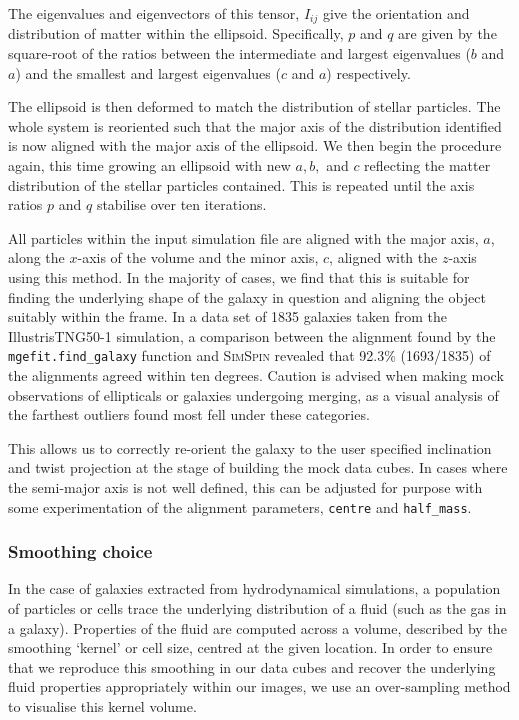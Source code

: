 \documentclass[
  journal=pasa,
  manuscript=research-paper, %
  year=2020,
  volume=37,
]{cup-journal}
\newcommand{\simspin}[1]{\textsc{SimSpin}#1} %
\begin{document}
The eigenvalues and eigenvectors of this tensor, $I_{ij}$ give the orientation and distribution of matter within the ellipsoid. 
Specifically, $p$ and $q$ are given by the square-root of the ratios between the intermediate and largest eigenvalues ($b$ and $a$) and the smallest and largest eigenvalues ($c$ and $a$) respectively. 

The ellipsoid is then deformed to match the distribution of stellar particles.
The whole system is reoriented such that the major axis of the distribution identified is now aligned with the major axis of the ellipsoid. 
We then begin the procedure again, this time growing an ellipsoid with new $a, b,$ and $c$ reflecting the matter distribution of the stellar particles contained. 
This is repeated until the axis ratios $p$ and $q$ stabilise over ten iterations. 

All particles within the input simulation file are aligned with the major axis, $a$, along the $x$-axis of the volume and the minor axis, $c$, aligned with the $z$-axis using this method. 
In the majority of cases, we find that this is suitable for finding the underlying shape of the galaxy in question and aligning the object suitably within the frame. 
In a data set of 1835 galaxies taken from the IllustrisTNG50-1 simulation, a comparison between the alignment found by the \texttt{mgefit.find\_galaxy} function \citep{Cappellari2002Efficientgalaxies} and \simspin{} revealed that 92.3\% (1693/1835) of the alignments agreed within ten degrees. 
Caution is advised when making mock observations of ellipticals or galaxies undergoing merging, as a visual analysis of the farthest outliers found most fell under these categories.

This allows us to correctly re-orient the galaxy to the user specified inclination and twist projection at the stage of building the mock data cubes. 
In cases where the semi-major axis is not well defined, this can be adjusted for purpose with some experimentation of the alignment parameters, \texttt{centre} and \texttt{half\_mass}.


\subsubsection{Smoothing choice}
In the case of galaxies extracted from hydrodynamical simulations, a population of particles or cells trace the underlying distribution of a fluid (such as the gas in a galaxy). 
Properties of the fluid are computed across a volume, described by the smoothing `kernel' or cell size, centred at the given location. 
In order to ensure that we reproduce this smoothing in our data cubes and recover the underlying fluid properties appropriately within our images, we use an over-sampling method to visualise this kernel volume.
\end{document}

